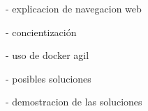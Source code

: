 
- explicacion de navegacion web

- concientización

- uso de docker agil

- posibles soluciones

- demostracion de las soluciones
